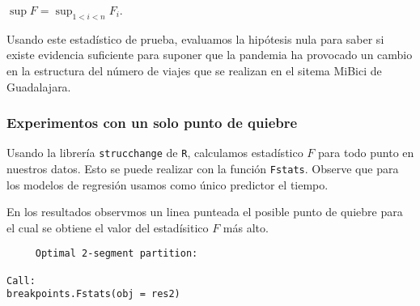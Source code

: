 \documentclass[
]{article}
\newenvironment{Shaded}{}{}
\newcommand{\AttributeTok}[1]{\textcolor[rgb]{0.49,0.56,0.16}{#1}}
\newcommand{\CommentTok}[1]{\textcolor[rgb]{0.38,0.63,0.69}{\textit{#1}}}
\newcommand{\DecValTok}[1]{\textcolor[rgb]{0.25,0.63,0.44}{#1}}
\newcommand{\FunctionTok}[1]{\textcolor[rgb]{0.02,0.16,0.49}{#1}}
\newcommand{\NormalTok}[1]{#1}
\newcommand{\OtherTok}[1]{\textcolor[rgb]{0.00,0.44,0.13}{#1}}
\newcommand{\SpecialCharTok}[1]{\textcolor[rgb]{0.25,0.44,0.63}{#1}}
\newcommand{\StringTok}[1]{\textcolor[rgb]{0.25,0.44,0.63}{#1}}
\begin{document}
\(\sup F = \sup_{1< i <n} F_i.\)

Usando este estadístico de prueba, evaluamos la hipótesis nula para
saber si existe evidencia suficiente para suponer que la pandemia ha
provocado un cambio en la estructura del número de viajes que se
realizan en el sitema MiBici de Guadalajara.

\hypertarget{experimentos-con-un-solo-punto-de-quiebre}{%
\subsubsection{Experimentos con un solo punto de
quiebre}\label{experimentos-con-un-solo-punto-de-quiebre}}

Usando la librería \texttt{strucchange} de \texttt{R}, calculamos
estadístico \(F\) para todo punto en nuestros datos. Esto se puede
realizar con la función \texttt{Fstats}. Observe que para los modelos de
regresión usamos como único predictor el tiempo.

\begin{Shaded}
\end{Shaded}

En los resultados observmos un linea punteada el posible punto de
quiebre para el cual se obtiene el valor del estadísitico \(F\) más
alto.

\begin{verbatim}
	 Optimal 2-segment partition:

Call:
breakpoints.Fstats(obj = res2)
\end{verbatim}
\end{document}

